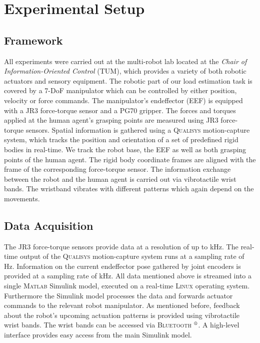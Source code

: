 \section{Experimental Setup}
\subsection{Framework}
All experiments were carried out at the multi-robot lab located at the \textit{Chair of Information-Oriented Control} (TUM), which provides a variety of both robotic actuators and sensory equipment. The robotic part of our load estimation task is covered by a 7-DoF manipulator which can be controlled by either position, velocity or force commands. The manipulator's endeffector (EEF) is equipped with a \textsc{JR3} force-torque sensor and a \textsc{PG70} gripper. The forces and torques applied at the human agent's grasping points are measured using \textsc{JR3} force-torque sensors. Spatial information is gathered using a \textsc{Qualisys} motion-capture system, which tracks the position and orientation of a set of predefined rigid bodies in real-time. We track the robot base, the EEF as well as both grasping points of the human agent. The rigid body coordinate frames are aligned with the frame of the corresponding force-torque sensor. The information exchange between the robot and the human agent is carried out via vibrotactile wrist bands. The wristband vibrates with different patterns which again depend on the movements.
\subsection{Data Acquisition}
The \textsc{JR3} force-torque sensors provide data at a resolution of up to \unit[8]{kHz}. The real-time output of the \textsc{Qualisys} motion-capture system runs at a sampling rate of \unit[150]{Hz}. Information on the current endeffector pose gathered by joint encoders is provided at a sampling rate of \unit[1]{kHz}. All data mentioned above is streamed into a single \textsc{Matlab} Simulink model, executed on a real-time \textsc{Linux} operating system. Furthermore the Simulink model processes the data and forwards actuator commands to the relevant robot manipulator.
As mentioned before, feedback about the robot's upcoming actuation patterns is provided using vibrotactile wrist bands. The wrist bands can be accessed via \textsc{Bluetooth $^\text{\textregistered}$}. A high-level interface provides easy access from the main Simulink model.


